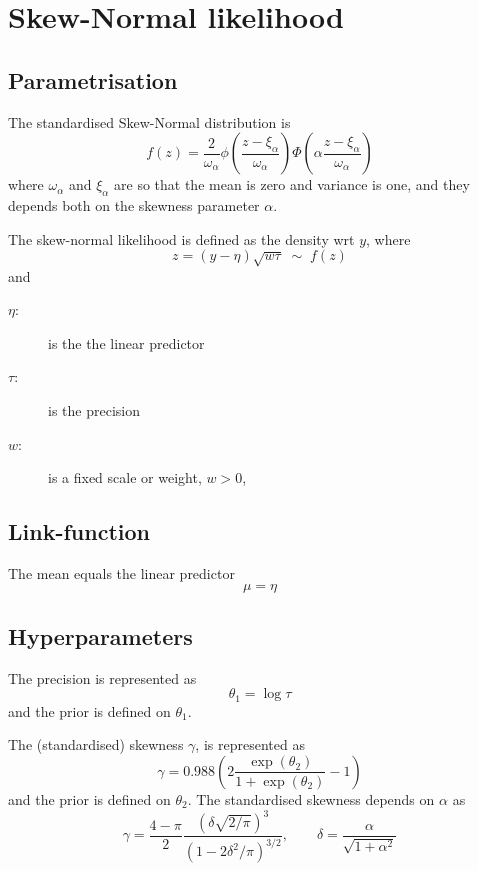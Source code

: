 \documentclass[a4paper,11pt]{article}
\begin{document}
\section*{Skew-Normal likelihood}

\subsection*{Parametrisation}

The standardised Skew-Normal distribution is
\begin{displaymath}
    f(z) = \frac{2}{\omega_{\alpha}}
    \phi\left(\frac{z -\xi_{\alpha}}{\omega_{\alpha}}\right)
    \Phi\left(\alpha \frac{z -\xi_{\alpha}}{\omega_{\alpha}}\right)
\end{displaymath}
where $\omega_\alpha$ and $\xi_\alpha$ are so that the mean is zero
and variance is one, and they depends both on the skewness parameter
$\alpha$.

The skew-normal likelihood is defined as the density wrt $y$, where
\begin{displaymath}
    z = (y - \eta)\sqrt{w \tau} \;\sim\; f(z)
\end{displaymath}
and
\begin{description}
\item[$\eta$:] is the the linear predictor
\item[$\tau$:] is the precision
\item[$w$:] is a fixed scale or weight, $w>0$,
\end{description}

\subsection*{Link-function}

The mean equals the linear predictor
\begin{displaymath}
    \mu = \eta
\end{displaymath}

\subsection*{Hyperparameters}

The precision is represented as
\begin{displaymath}
    \theta_{1} = \log \tau
\end{displaymath}
and the prior is defined on $\theta_{1}$. 

The (standardised) skewness $\gamma$, is represented as
\begin{displaymath}
    \gamma=0.988 (2\frac{\exp(\theta_2)}{1+\exp(\theta_2)}-1)
\end{displaymath}
and the prior is defined on $\theta_{2}$. The standardised skewness
depends on $\alpha$ as
\begin{displaymath}
\gamma ={\frac  {4-\pi }{2}}{\frac{\left(\delta {\sqrt  {2/\pi
              }}\right)^{3}}{\left(1-2\delta^{2}/\pi
        \right)^{{3/2}}}}, \qquad
    \delta ={\frac{\alpha}{{\sqrt{1+\alpha^{2}}}}}
\end{displaymath}
\end{document}
